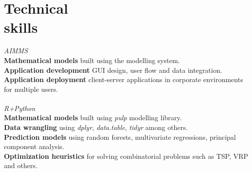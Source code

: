   			  
		\section{Technical \\ skills}

        \textsl{AIMMS}\\
					\hspace*{2ex}\textbf{Mathematical models} built using the modelling system.\\
					\hspace*{2ex}\textbf{Application development} GUI design, user flow and data integration.\\
					\hspace*{2ex}\textbf{Application deployment} client-server applications in corporate environments for multiple users.\\
        \\\textsl{R+Python}\\
					\hspace*{2ex}\textbf{Mathematical models} built using \textit{pulp} modelling library.\\
					\hspace*{2ex}\textbf{Data wrangling} using \textit{dplyr}, \textit{data.table}, \textit{tidyr} among others.\\
					\hspace*{2ex}\textbf{Prediction models} using random forests, multivariate regressions, principal component analysis.\\
					\hspace*{2ex}\textbf{Optimization heuristics} for solving combinatorial problems such as TSP, VRP and others.\\
